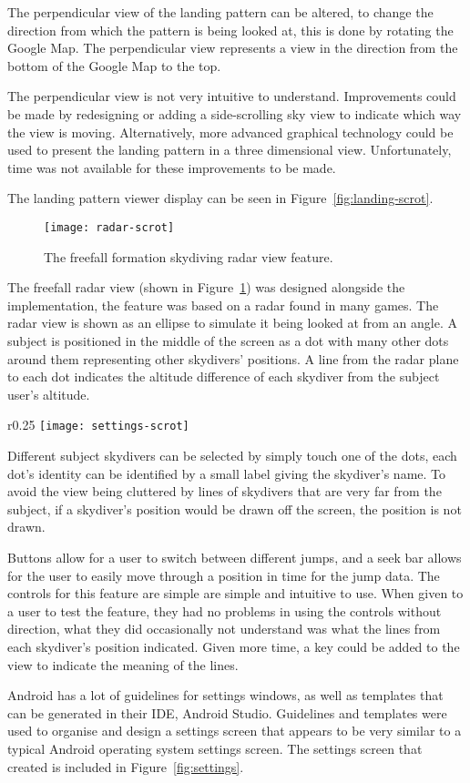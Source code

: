 The perpendicular view of the landing pattern can be altered, to change the direction from which the pattern is being looked at, this is done by rotating the Google Map. The perpendicular view represents a view in the direction from the bottom of the Google Map to the top.

The perpendicular view is not very intuitive to understand. Improvements could be made by redesigning or adding a side-scrolling sky view to indicate which way the view is moving. Alternatively, more advanced graphical technology could be used to present the landing pattern in a three dimensional view. Unfortunately, time was not available for these improvements to be made.

The landing pattern viewer display can be seen in Figure~\ref{fig:landing-scrot}.

\begin{figure}[!t]
  \centering
  \texttt{[image: radar-scrot]}
  \caption{The freefall formation skydiving radar view feature.}\label{fig:radar}
\end{figure}

The freefall radar view (shown in Figure~\ref{fig:radar}) was designed alongside the implementation, the feature was based on a radar found in many games. The radar view is shown as an ellipse to simulate it being looked at from an angle. A subject is positioned in the middle of the screen as a dot with many other dots around them representing other skydivers' positions. A line from the radar plane to each dot indicates the altitude difference of each skydiver from the subject user's altitude.

\begin{wrapfigure}[19]{r}{0.25\textwidth}
  \centering
  \texttt{[image: settings-scrot]}
  \caption{The settings screen for the app.}\label{fig:settings}
\end{wrapfigure}

Different subject skydivers can be selected by simply touch one of the dots, each dot's identity can be identified by a small label giving the skydiver's name. To avoid the view being cluttered by lines of skydivers that are very far from the subject, if a skydiver's position would be drawn off the screen, the position is not drawn.

Buttons allow for a user to switch between different jumps, and a seek bar allows for the user to easily move through a position in time for the jump data. The controls for this feature are simple are simple and intuitive to use. When given to a user to test the feature, they had no problems in using the controls without direction, what they did occasionally not understand was what the lines from each skydiver's position indicated. Given more time, a key could be added to the view to indicate the meaning of the lines.

Android has a lot of guidelines for settings windows, as well as templates that can be generated in their IDE, Android Studio. Guidelines and templates were used to organise and design a settings screen that appears to be very similar to a typical Android operating system settings screen.
The settings screen that created is included in Figure~\ref{fig:settings}.

